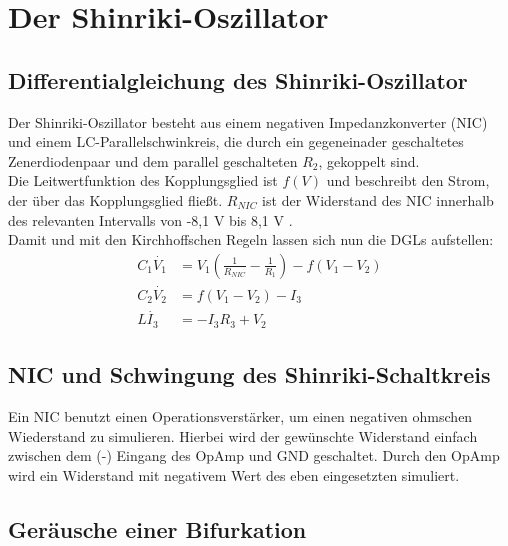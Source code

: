 

\section{Der Shinriki-Oszillator}
\label{sec:shinrikiOszi}

\subsection{Differentialgleichung des Shinriki-Oszillator}
\label{sub:dgl}

Der Shinriki-Oszillator besteht aus einem negativen Impedanzkonverter (NIC) und einem LC-Parallelschwinkreis, die durch ein gegeneinader geschaltetes Zenerdiodenpaar und dem parallel geschalteten \(R_2\), gekoppelt sind. \\
Die Leitwertfunktion des Kopplungsglied ist \( f(V)\) und beschreibt den Strom, der über das Kopplungsglied fließt.
\(R_{NIC}\) ist der Widerstand des NIC innerhalb des relevanten Intervalls von -8,1 V bis 8,1 V \citep[]{Lueck}.\\
Damit und mit den Kirchhoffschen Regeln lassen sich nun die DGLs aufstellen:
\begin{align}
    C_1 \dot{V_1} &= V_1 (\frac{1}{R_{NIC}}-\frac{1}{R_1}) - f(V_1-V_2) \\
    C_2 \dot{V_2} &= f(V_1-V_2) - I_3 \\
    L \dot{I_3} &= -I_3R_3 + V_2
\end{align}

\subsection{NIC und Schwingung des Shinriki-Schaltkreis}
\label{sub:nic}
Ein NIC benutzt einen Operationsverstärker, um einen negativen ohmschen Wiederstand zu simulieren. Hierbei wird der gewünschte Widerstand einfach zwischen dem (-) Eingang des OpAmp und GND geschaltet. Durch den OpAmp wird ein Widerstand mit negativem Wert des eben eingesetzten simuliert.

\subsection{Geräusche einer Bifurkation}
\label{sub:tonBifurkation}
